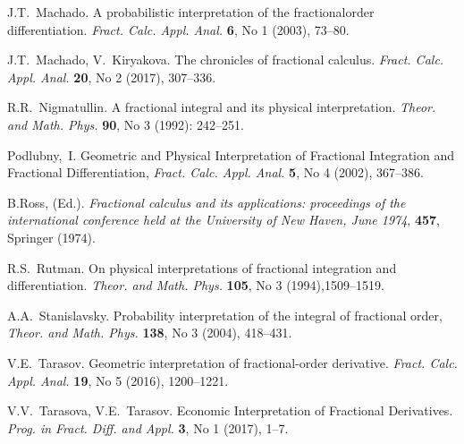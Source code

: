\documentclass[twoside,reqno,11pt]{fcaa-var} %
\begin{document}
\begin{thebibliography}{99}
 J.T.~Machado. A probabilistic interpretation of the fractionalorder differentiation. \textit{Fract. Calc. Appl. Anal.} \textbf{6}, No 1 (2003), 73--80.


 J.T.~Machado, V.~Kiryakova. The chronicles of fractional calculus. \textit{Fract. Calc. Appl. Anal.} \textbf{20}, No 2 (2017), 307--336.


 R.R.~Nigmatullin. A fractional integral and its physical interpretation. \textit{Theor. and Math. Phys.} \textbf{90}, No 3 (1992): 242--251.

 Podlubny,~I. Geometric and Physical Interpretation of Fractional Integration and Fractional Differentiation, \textit{Fract. Calc. Appl. Anal.} \textbf{5}, No 4 (2002), 367--386.



 B.Ross, (Ed.). \textit{Fractional calculus and its applications: proceedings of the international conference held at the University of New Haven, June 1974}, \textbf{457}, Springer (1974).
 
 R.S.~Rutman. On physical interpretations of fractional integration and differentiation. \textit{Theor. and Math. Phys.} \textbf{105}, No 3 (1994),1509--1519.

 A.A.~Stanislavsky.  Probability interpretation of the integral of fractional order, \textit{Theor. and Math. Phys.} \textbf{138}, No 3 (2004), 418--431.

 V.E.~Tarasov. Geometric interpretation of fractional-order derivative. \textit{Fract. Calc. Appl. Anal.} \textbf{19}, No 5 (2016), 1200--1221.

 V.V.~Tarasova, V.E.~Tarasov. Economic Interpretation of Fractional Derivatives. \textit{Prog. in Fract. Diff. and Appl.} \textbf{3}, No 1 (2017), 1--7.  


\end{thebibliography}
\end{document}
